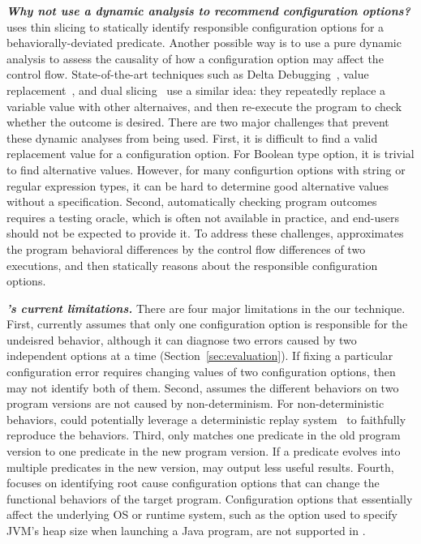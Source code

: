 \vspace{1mm}
\noindent \textbf{\textit{Why not use a dynamic analysis to recommend
configuration options?}}
\ourtool uses thin slicing to statically identify responsible configuration
options for a behaviorally-deviated predicate. Another possible way is to use a pure
dynamic analysis to assess the causality of how a configuration option
may affect the control flow. State-of-the-art
techniques such as Delta Debugging~\cite{dd}, value replacement~\cite{failuredoc},
and dual slicing~\cite{Sumner:2013:CCE}
use a similar idea: they repeatedly replace a variable value with other alternaives,
and then re-execute the program to check whether the outcome is desired.
There are two major challenges that prevent these dynamic analyses
from being used. First, it is
difficult to find a valid replacement value for a configuration option.
For Boolean type option, it is trivial to find alternative values.
However, for many configurtion options with string or regular expression types, it
can be hard to determine good alternative values without a specification.
Second, automatically checking program outcomes requires
a testing oracle, which is often not available in practice, and end-users
should not be  expected to provide it. To address these challenges,
\ourtool approximates the program behavioral differences by the
control flow differences of two executions, and then statically reasons
about the responsible configuration options.



\vspace{1mm}
\noindent \textbf{\textit{\ourtool's current limitations.}}
There are four major limitations in the our \ourtool technique.
First, \ourtool currently assumes that only one
configuration option is responsible for the undeisred behavior,
although it can diagnose two errors caused by two independent options
at a time (Section~\ref{sec:evaluation}).
If fixing a particular configuration error
requires changing values of two configuration options,
then \ourtool may not identify both of them.
Second, \ourtool assumes the different behaviors
on two program versions are not caused by non-determinism.
For non-deterministic behaviors, \ourtool
could potentially leverage a deterministic replay
system~\cite{Huang:2013:CRL, Jin:2012:BRF} to faithfully reproduce the behaviors.
Third, \ourtool only matches one predicate in the old
program version to one predicate in the new program version.
If a predicate evolves into multiple predicates in the new
version, \ourtool may output less useful results. 
Fourth, \ourtool focuses on identifying root cause
configuration options that can change the functional behaviors of
the target program.
Configuration options that essentially affect the underlying
OS or runtime system, such as the  option used to
specify JVM's heap size when launching a Java program,
are not supported in \ourtool.
